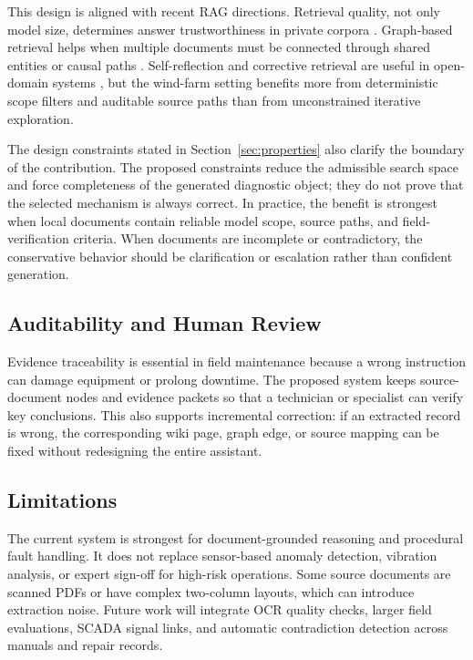\documentclass[lettersize,journal]{IEEEtran}
\begin{document}
This design is aligned with recent RAG directions. Retrieval quality, not only model size, determines answer trustworthiness in private corpora \cite{es2023ragas,zhao2024ragSurvey}. Graph-based retrieval helps when multiple documents must be connected through shared entities or causal paths \cite{edge2024graphrag,peng2024graphragSurvey}. Self-reflection and corrective retrieval are useful in open-domain systems \cite{asai2023selfrag,yan2024crag}, but the wind-farm setting benefits more from deterministic scope filters and auditable source paths than from unconstrained iterative exploration.

The design constraints stated in Section~\ref{sec:properties} also clarify the boundary of the contribution. The proposed constraints reduce the admissible search space and force completeness of the generated diagnostic object; they do not prove that the selected mechanism is always correct. In practice, the benefit is strongest when local documents contain reliable model scope, source paths, and field-verification criteria. When documents are incomplete or contradictory, the conservative behavior should be clarification or escalation rather than confident generation.

\subsection{Auditability and Human Review}
Evidence traceability is essential in field maintenance because a wrong instruction can damage equipment or prolong downtime. The proposed system keeps source-document nodes and evidence packets so that a technician or specialist can verify key conclusions. This also supports incremental correction: if an extracted record is wrong, the corresponding wiki page, graph edge, or source mapping can be fixed without redesigning the entire assistant.

\subsection{Limitations}
The current system is strongest for document-grounded reasoning and procedural fault handling. It does not replace sensor-based anomaly detection, vibration analysis, or expert sign-off for high-risk operations. Some source documents are scanned PDFs or have complex two-column layouts, which can introduce extraction noise. Future work will integrate OCR quality checks, larger field evaluations, SCADA signal links, and automatic contradiction detection across manuals and repair records.
\end{document}
